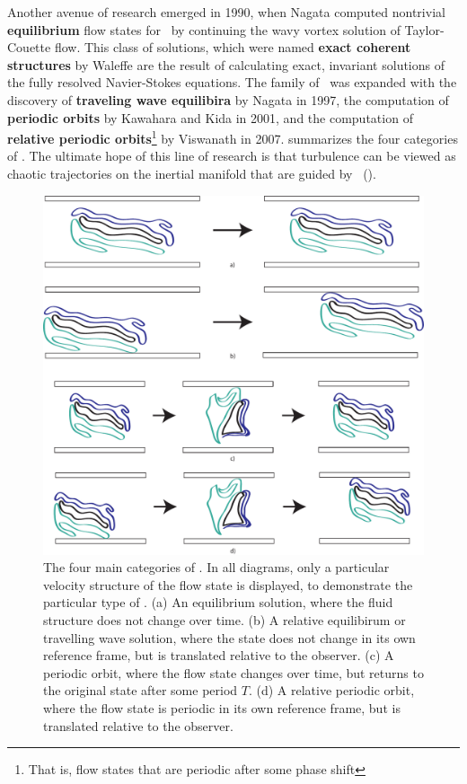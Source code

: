 Another avenue of research emerged in 1990, when Nagata computed nontrivial {\bf equilibrium} flow states for \pCf\ by continuing the wavy vortex solution of Taylor-Couette flow. This class of solutions, which were named {\bf exact coherent structures} by Waleffe are the result of calculating exact, invariant solutions of the fully resolved Navier-Stokes equations. The family of \ecs\ was expanded with the discovery of {\bf traveling wave equilibira} by Nagata in 1997, the computation of {\bf periodic orbits} by Kawahara and Kida in 2001, and the computation of {\bf relative periodic orbits}\footnote{That is, flow states that are periodic after some phase shift} by Viswanath in 2007.  summarizes the four categories of \ecs. The ultimate hope of this line of research is that turbulence can be viewed as chaotic trajectories on the inertial manifold that are guided by \ecs~(). \\
\begin{figure}[ht!]
\centerline{\includegraphics[scale=0.5]{Figs/ECSClassification}}
\caption{The four main categories of \ecs. In all diagrams, only a particular velocity structure of the flow state is displayed, to demonstrate the particular type of \ecs. (a) An {equilibrium} solution, where the fluid structure does not change over time. (b) A {relative equilibirum} or {travelling wave} solution, where the state does not change in its own reference frame, but is translated relative to the observer. (c) A {periodic orbit}, where the flow state changes over time, but returns to the original state after some period $T$. (d) A {relative periodic orbit}, where the flow state is periodic in its own reference frame, but is translated relative to the observer.}\label{fig:ECS}
\end{figure}


